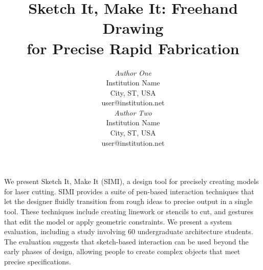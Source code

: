 \documentclass{article}
\begin{document}

\toappear{}



\title{Sketch It, Make It: Freehand Drawing\\
for Precise Rapid Fabrication}

\author{
\parbox[t]{9cm}{\centering
	     {\em Author One}\\
	     Institution Name\\
             City, ST, USA\\
	     user@institution.net}
\parbox[t]{9cm}{\centering
	     {\em Author Two}\\
	     Institution Name\\
             City, ST, USA\\
	     user@institution.net}
}

\maketitle

\abstract We present Sketch It, Make It (SIMI), a design tool for
precisely creating models for laser cutting. SIMI provides a suite of
pen-based interaction techniques that let the designer fluidly
transition from rough ideas to precise output in a single tool. These
techniques include creating linework or stencils to cut, and gestures
that edit the model or apply geometric constraints. We present a
system evaluation, including a study involving 60 undergraduate
architecture students. The evaluation suggests that sketch-based
interaction can be used beyond the early phases of design, allowing
people to create complex objects that meet precise specifications.





\end{document}
